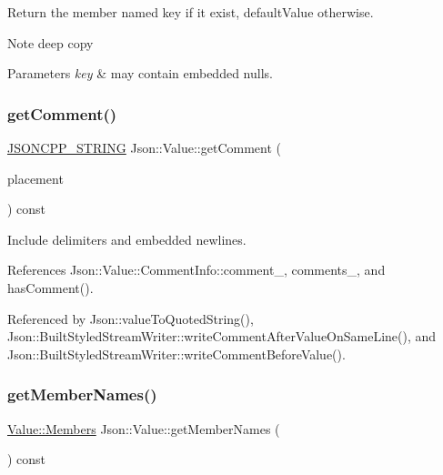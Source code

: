 Return the member named key if it exist, default\+Value otherwise. \begin{DoxyNote}{Note}
deep copy 
\end{DoxyNote}

\begin{DoxyParams}{Parameters}
{\em key} & may contain embedded nulls. \\
\hline
\end{DoxyParams}
\mbox{\label{classJson_1_1Value_a82817229a986f0b254e31d5c83066ffe_a82817229a986f0b254e31d5c83066ffe}} 
\subsubsection{\texorpdfstring{get\+Comment()}{getComment()}}
{\footnotesize\ttfamily \hyperlink{json_8h_a1e723f95759de062585bc4a8fd3fa4be_a1e723f95759de062585bc4a8fd3fa4be}{J\+S\+O\+N\+C\+P\+P\+\_\+\+S\+T\+R\+I\+NG} Json\+::\+Value\+::get\+Comment (\begin{DoxyParamCaption}\item[{\hyperlink{namespaceJson_a4fc417c23905b2ae9e2c47d197a45351_a4fc417c23905b2ae9e2c47d197a45351}{Comment\+Placement}}]{placement }\end{DoxyParamCaption}) const}



Include delimiters and embedded newlines. 



References Json\+::\+Value\+::\+Comment\+Info\+::comment\+\_\+, comments\+\_\+, and has\+Comment().



Referenced by Json\+::value\+To\+Quoted\+String(), Json\+::\+Built\+Styled\+Stream\+Writer\+::write\+Comment\+After\+Value\+On\+Same\+Line(), and Json\+::\+Built\+Styled\+Stream\+Writer\+::write\+Comment\+Before\+Value().

\mbox{\label{classJson_1_1Value_a79d7725dce6260317333e69022367ac9_a79d7725dce6260317333e69022367ac9}} 
\subsubsection{\texorpdfstring{get\+Member\+Names()}{getMemberNames()}}
{\footnotesize\ttfamily \hyperlink{classJson_1_1Value_a9ae9069983fc38f1928d76f9c79ac64d_a9ae9069983fc38f1928d76f9c79ac64d}{Value\+::\+Members} Json\+::\+Value\+::get\+Member\+Names (\begin{DoxyParamCaption}{ }\end{DoxyParamCaption}) const}




